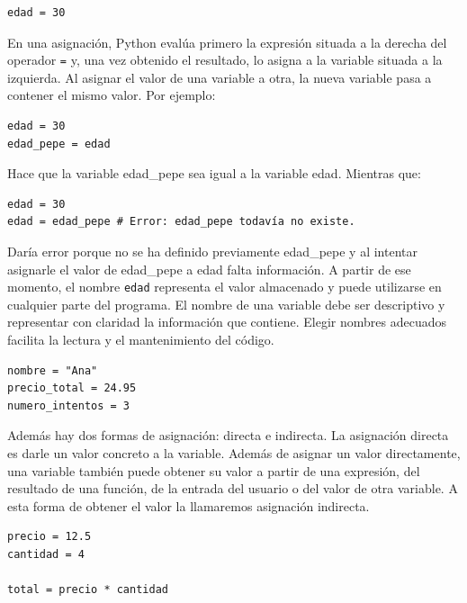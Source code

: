 \documentclass[11pt,a5paper,twoside]{book}
\begin{document}
\begin{tcolorbox}
\scriptsize
 \begin{verbatim}
edad = 30
\end{verbatim}
\end{tcolorbox}
En una asignación, Python evalúa primero la expresión situada a la derecha del operador {\scriptsize \texttt{=}} y, una vez obtenido el resultado, lo asigna a la variable situada a la izquierda. Al asignar el valor de una variable a otra, la nueva variable pasa a contener el mismo valor.
Por ejemplo:


\begin{tcolorbox}
\scriptsize
 \begin{verbatim}
edad = 30
edad_pepe = edad
\end{verbatim}
\end{tcolorbox}
Hace que la variable edad\_pepe sea igual a la variable edad. Mientras que:


\begin{tcolorbox}
\scriptsize
 \begin{verbatim}
edad = 30
edad = edad_pepe # Error: edad_pepe todavía no existe.
\end{verbatim}
\end{tcolorbox}
Daría error porque no se ha definido previamente edad\_pepe y al intentar asignarle el valor de edad\_pepe a edad falta información.
A partir de ese momento, el nombre {\scriptsize \texttt{edad}} representa el valor almacenado y puede utilizarse en cualquier parte del programa.
El nombre de una variable debe ser descriptivo y representar con claridad la información que contiene. Elegir nombres adecuados facilita la lectura y el mantenimiento del código.


\begin{tcolorbox}
\scriptsize
 \begin{verbatim}
nombre = "Ana"
precio_total = 24.95
numero_intentos = 3
\end{verbatim}
\end{tcolorbox}
Además hay dos formas de asignación: directa e indirecta. La asignación directa es darle un valor concreto a la variable. Además de asignar un valor directamente, una variable también puede obtener su valor a partir de una expresión, del resultado de una función, de la entrada del usuario o del valor de otra variable. A esta forma de obtener el valor la llamaremos asignación indirecta.


\begin{tcolorbox}
\scriptsize
 \begin{verbatim}
precio = 12.5
cantidad = 4

total = precio * cantidad
\end{verbatim}
\end{tcolorbox}
\end{document}
